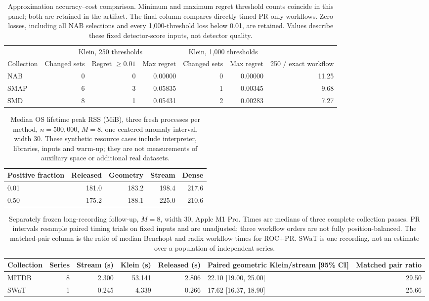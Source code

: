 \begin{table}[t]\centering\small
\begin{tabular}{lrrrrrr}\toprule
& \multicolumn{3}{c}{Klein, 250 thresholds} & \multicolumn{2}{c}{Klein, 1,000 thresholds} &\\
Collection & Changed sets & Regret $\ge0.01$ & Max regret & Changed sets & Max regret & 250 / exact workflow\\\midrule
NAB & 0 & 0 & 0.00000 & 0 & 0.00000 & 11.25\\
SMAP & 6 & 3 & 0.05835 & 1 & 0.00345 & 9.68\\
SMD & 8 & 1 & 0.05431 & 2 & 0.00283 & 7.27\\
\bottomrule\end{tabular}
\caption{Approximation accuracy--cost comparison. Minimum and maximum regret
threshold counts coincide in this panel; both are retained in the artifact.
The final column compares directly timed PR-only workflows. Zero losses,
including all NAB selections and every 1,000-threshold loss below 0.01, are
retained. Values describe these fixed detector-score inputs, not detector quality.}
\label{tab:accuracy-new}\end{table}
\begin{table}[t]\centering\small
\begin{tabular}{lrrrr}\toprule
Positive fraction & Released & Geometry & Stream & Dense\\\midrule
0.01 & 181.0 & 183.2 & 198.4 & 217.6\\
0.50 & 175.2 & 188.1 & 225.0 & 210.6\\
\bottomrule\end{tabular}
\caption{Median OS lifetime peak RSS (MiB), three fresh processes per method,
$n=500{,}000$, $M=8$, one centered anomaly interval, width 30. These synthetic
resource cases include interpreter, libraries, inputs and warm-up; they are not
measurements of auxiliary space or additional real datasets.}
\label{tab:memory-new}\end{table}
\begin{table}[t]\centering\small
\begin{tabular}{lrrrrl r}\toprule
Collection & Series & Stream (s) & Klein (s) & Released (s) & Paired geometric Klein/stream [95\% CI] & Matched pair ratio\\\midrule
MITDB & 8 & 2.300 & 53.141 & 2.806 & 22.10 [19.00, 25.00] & 29.50\\
SWaT & 1 & 0.245 & 4.339 & 0.266 & 17.62 [16.37, 18.90] & 25.66\\
\bottomrule\end{tabular}
\caption{Separately frozen long-recording follow-up, $M=8$, width 30, Apple M1 Pro.
Times are medians of three complete collection passes. PR intervals resample
paired timing trials on fixed inputs and are unadjusted; three workflow orders
are not fully position-balanced. The matched-pair column is the ratio of median
Benchopt and radix workflow times for ROC+PR. SWaT is one recording, not an estimate
over a population of independent series.}
\label{tab:long-new}\end{table}
